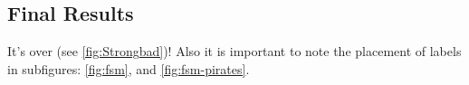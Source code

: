 \documentclass[letterpaper,12pt]{article}
\begin{document}
\subsection{Final Results}
It's over (see \ref{fig:Strongbad})!  Also it is important to note the placement of labels in subfigures: \ref{fig:fsm}, and \ref{fig:fsm-pirates}.

\begin{figure}
	\begin{center}
		 \\
\end{center}
\end{figure}
\end{document}

